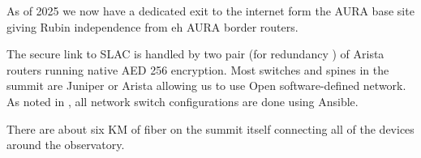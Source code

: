 As of 2025 we now have a dedicated exit to the internet form the AURA base site giving Rubin independence from eh AURA border routers.

The secure link to SLAC is handled by two pair (for redundancy ) of Arista routers running native AED 256 encryption.
Most switches and spines in the summit are Juniper or Arista allowing us to use Open software-defined network.
As noted in , all network switch configurations are done using Ansible.

There are about  six KM of fiber on the summit itself connecting all of the devices around the observatory.


